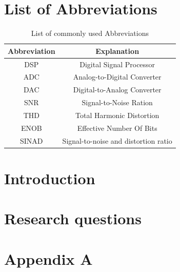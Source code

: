 \documentclass[11pt, a4paper]{report}
\begin{document}
\begin{justify}

\newpage
\tableofcontents
\thispagestyle{empty}

\listoffigures
\thispagestyle{empty}

\listoftables
\thispagestyle{empty}

\newpage
\pagestyle{plain}
\setcounter{page}{1}

\chapter*{List of Abbreviations}
\begin{table}[!h]
	\centering
\begin{tabular}{|c|c|}
	\hline
\textbf{Abbreviation} & \textbf{Explanation}        			\\ \hline
DSP                   & Digital Signal Processor    			\\ \hline
ADC                   & Analog-to-Digital Converter				\\ \hline
DAC                   & Digital-to-Analog Converter				\\ \hline
SNR 				  & Signal-to-Noise Ration    				\\ \hline
THD 				  & Total Harmonic Distortion 				\\ \hline
ENOB 				  & Effective Number Of Bits 		   		\\ \hline
SINAD 				  & Signal-to-noise and distortion ratio	\\ \hline
\end{tabular}
\caption{List of commonly used Abbreviations}
\label{Abbreviation list}
\end{table}

\chapter{Introduction}
%	

\chapter{Research questions}

	

\printbibliography[
	heading=bibintoc,
	title={Bibliography}
]

\appendix

\chapter{Appendix A}

\end{justify}
\end{document}
